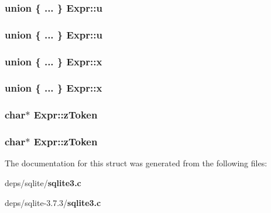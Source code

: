 \subsubsection{\setlength{\rightskip}{0pt plus 5cm}union \{ ... \}   \bf{Expr::u}}\label{structExpr_2c0542a250e09c79b58e294860cc2d48}


\subsubsection{\setlength{\rightskip}{0pt plus 5cm}union \{ ... \}   \bf{Expr::u}}\label{structExpr_8a835d57985941cd0518cd80fab44a00}


\subsubsection{\setlength{\rightskip}{0pt plus 5cm}union \{ ... \}   \bf{Expr::x}}\label{structExpr_842be5758a0ad8c191ead1ee865ab20e}


\subsubsection{\setlength{\rightskip}{0pt plus 5cm}union \{ ... \}   \bf{Expr::x}}\label{structExpr_ab1ab6dfbe60670eac78c808ac477248}


\subsubsection{\setlength{\rightskip}{0pt plus 5cm}char$\ast$ \bf{Expr::z\-Token}}\label{structExpr_db3ec7ee0c708100fa9577e9d059f364}


\subsubsection{\setlength{\rightskip}{0pt plus 5cm}char$\ast$ \bf{Expr::z\-Token}}\label{structExpr_db3ec7ee0c708100fa9577e9d059f364}




The documentation for this struct was generated from the following files:\begin{CompactItemize}
\item 
deps/sqlite/\bf{sqlite3.c}\item 
deps/sqlite-3.7.3/\bf{sqlite3.c}\end{CompactItemize}

